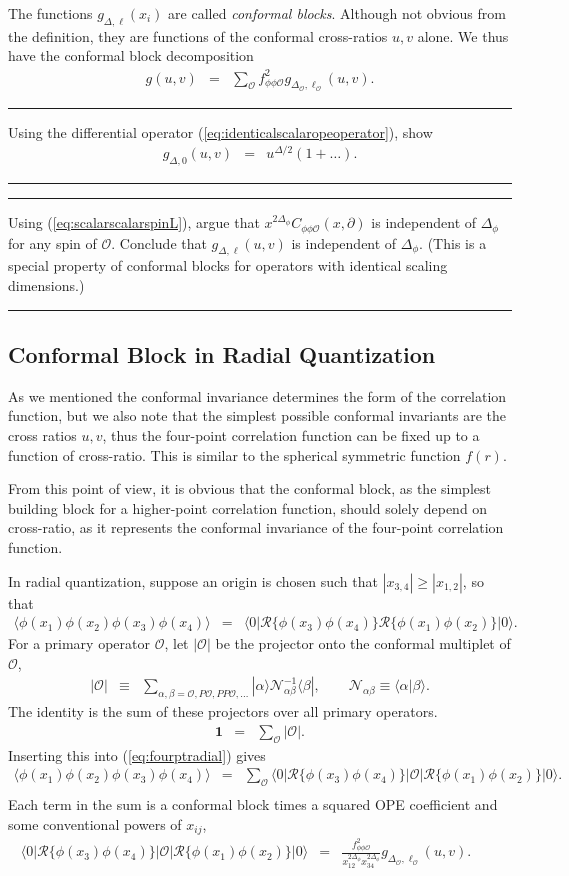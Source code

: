 \documentclass[12pt]{article}
\numberwithin{equation}{section}
\newcommand\be{\begin{eqnarray}}
\newcommand\ee{\end{eqnarray}}
\newcommand\f\phi
\newcommand\cO{\mathcal{O}}
\newcommand\p[1]{\left(#1\right)}
\newcommand\ptl\partial
\newcommand\<\langle
\renewcommand\>\rangle
\newcommand\nn{\nonumber}
\renewcommand\.{\cdot}
\newcommand\De{\Delta}
\renewcommand\b\beta
\renewcommand\a\alpha
\begin{document}
The functions $g_{\De,\ell}(x_i)$ are called {\it conformal blocks}.  Although not obvious from the definition, they are functions of the conformal cross-ratios $u,v$ alone.  We thus have the conformal block decomposition
\be
g(u,v) &=& \sum_\cO f_{\f\f\cO}^2 g_{\De_\cO,\ell_\cO}(u,v).
\ee
\noindent\rule[0.5ex]{\linewidth}{1pt}
Using the differential operator (\ref{eq:identicalscalaropeoperator}), show
\be
\label{eq:boundaryconditionforblock}
g_{\De,0}(u,v) &=& u^{\De/2}\p{1+\dots}.
\ee
\noindent\rule[0.5ex]{\linewidth}{1pt}
\noindent\rule[0.5ex]{\linewidth}{1pt}
Using (\ref{eq:scalarscalarspinL}), argue that $x^{2\De_\f} C_{\f\f\cO}(x,\ptl)$ is independent of $\Delta_\phi$ for any spin of $\cO$. Conclude that $g_{\De,\ell}(u,v)$ is independent of $\Delta_\phi$. (This is a special property of conformal blocks for operators with identical scaling dimensions.)

\noindent\rule[0.5ex]{\linewidth}{1pt}

\subsection{Conformal Block in Radial Quantization}

As we mentioned the conformal invariance determines the form of the correlation function, but we also note that the simplest possible conformal invariants are the cross ratios $u, v$, thus the four-point correlation function can be fixed up to a function of cross-ratio. This is similar to the spherical symmetric function $f(r)$. 

From this point of view, it is obvious that the conformal block, as the simplest building block for a higher-point correlation function, should solely depend on cross-ratio, as it represents the conformal invariance of the four-point correlation function.

In radial quantization, suppose an origin is chosen such that $|x_{3,4}|\geq |x_{1,2}|$, so that
\be
\label{eq:fourptradial}
\<\f(x_1)\f(x_2)\f(x_3)\f(x_4)\> &=& \<0|\mathcal{R}\{\f(x_3)\f(x_4)\}\mathcal{R}\{\f(x_1)\f(x_2)\}|0\>.\quad
\ee
For a primary operator $\cO$, let $|\cO|$ be the projector onto the conformal multiplet of $\cO$,
\be
|\cO| &\equiv& \sum_{\a,\b=\cO,P\cO,PP\cO,\dots} |\a\>\mathcal{N}^{-1}_{\a\b}\<\b|,\qquad
\mathcal{N}_{\a\b} \equiv \<\a|\b\>.
\ee
The identity is the sum of these projectors over all primary operators.
\be
\mathbf{1} &=& \sum_\cO |\cO|.
\ee
Inserting this into (\ref{eq:fourptradial}) gives
\be
\label{eq:insertingprojector}
\<\f(x_1)\f(x_2)\f(x_3)\f(x_4)\> &=& \sum_\cO\<0|\mathcal{R}\{\f(x_3)\f(x_4)\}|\cO|\mathcal{R}\{\f(x_1)\f(x_2)\}|0\>.\nn\\
\ee
Each term in the sum is a conformal block times a squared OPE coefficient and some conventional powers of $x_{ij}$,
\be
\label{eq:newdefinitionofg}
\<0|\mathcal{R}\{\f(x_3)\f(x_4)\}|\cO|\mathcal{R}\{\f(x_1)\f(x_2)\}|0\> &=& \frac{f_{\f\f\cO}^2}{x_{12}^{2\De_\f}x_{34}^{2\De_\f}}g_{\De_\cO,\ell_\cO}(u,v).\qquad
\ee
\end{document}
